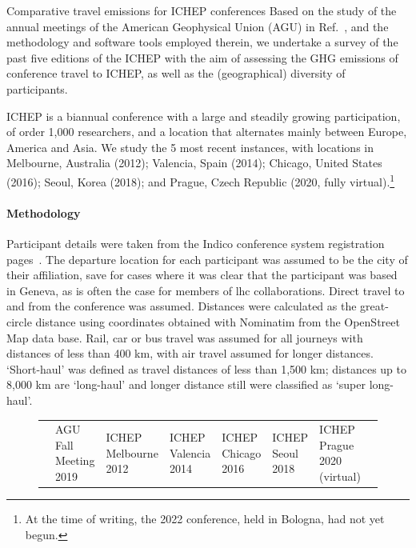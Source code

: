 \documentclass[../SustainableHEP.tex]{subfiles}
\begin{document}
\begin{casestudy}{Comparative travel emissions for ICHEP conferences}%
Based on the study of the annual meetings of the American Geophysical Union (AGU) in Ref.~\cite{RefAGU}, and the methodology and software tools employed therein, we undertake a survey of the past five editions of the ICHEP with the aim of assessing the GHG emissions of conference travel to ICHEP, as well as the (geographical) diversity of participants.

ICHEP is a biannual conference with a large and steadily growing participation, of order 1,000 researchers, and a location that alternates mainly between Europe, America and Asia.  We study the 5 most recent instances, with locations in Melbourne, Australia (2012); Valencia, Spain (2014); Chicago, United States (2016); Seoul, Korea (2018); and Prague, Czech Republic (2020, fully virtual).\footnote{At the time of writing, the 2022 conference, held in Bologna, had not yet begun.}

\paragraph{Methodology}

Participant details were taken from the Indico conference system registration pages~\cite{indico}. The departure location for each participant was assumed to be the city of their affiliation, save for cases where it was clear that the participant was based in Geneva, as is often the case for members of \acrshort{lhc} collaborations. Direct travel to and from the conference was assumed.  Distances were calculated as the great-circle distance using coordinates obtained with Nominatim from the OpenStreet Map data base. Rail, car or bus travel was assumed for all journeys with distances of less than 400 km, with air travel assumed for longer distances.  `Short-haul' was defined as travel distances of less than 1,500 km; distances up to 8,000 km are `long-haul' and longer distance still were classified as `super long-haul'.
\\
\bigskip
\begin{figure}
{\scriptsize
{}
\captionsetup{type=table}
\begin{tabular}{@{}p{2.3cm}>{\baselineskip=10pt}p{1.8cm}>{\baselineskip=10pt}p{1.5cm}>{\baselineskip=10pt}p{1.5cm}>{\baselineskip=10pt}p{1.5cm}>{\baselineskip=10pt}p{1.4cm}>{\baselineskip=10pt}p{1.7cm}c@{}}\toprule
&AGU Fall Meeting 2019 & 
ICHEP Melbourne 2012 & 
ICHEP Valencia 2014 &
ICHEP Chicago 2016 & 
ICHEP Seoul 2018 &         
ICHEP Prague 2020 (virtual) \\ \cmidrule{2-7}
    

\end{tabular}}
\end{figure}
\end{casestudy}
\end{document}
